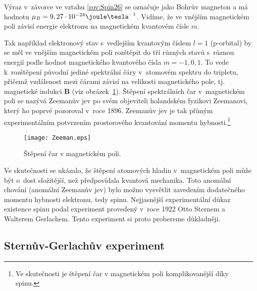 \noindent Výraz v~závorce ve vztahu \eqref{rov:Spin26} se označuje jako Bohrův magneton a má hodnotu $\mu_B = 9,27 \cdot 10^{-24} \joule \tesla^{-1}$. Vidíme, že ve vnějším magnetickém poli závisí energie elektronu na magnetickém kvantovém čísle $m$.

Tak například elektronový stav s~vedlejším kvantovým číslem $l = 1$ (p-orbital) by se měl ve vnějším magnetickém poli rozštěpit do tří různých stavů s~různou energií podle hodnot magnetického kvantového čísla $m = -1, 0, 1$. To vede k~rozštěpení původní jediné spektrální čáry v~atomovém spektru do tripletu, přičemž vzdálenost mezi čárami závisí na velikosti magnetického pole, tj. magnetické indukci $\mathbf{B}$ (viz obrázek~\ref{obr:Zeeman}). Štěpení spektrálních čar v~magnetickém poli se nazývá Zeemanův jev po svém objeviteli holandském fyzikovi Zeemanovi, který ho poprvé pozoroval v~roce 1896. Zeemanův jev je tak přímým experimentálním potvrzením prostorového kvantování momentu hybnosti.\footnote{Ve skutečnosti je štěpení čar v magnetickém poli komplikovanější díky spinu.}

\begin{figure} [htb]
\centering
\texttt{[image: Zeeman.eps]}
\caption{Štěpení čar v magnetickém poli.}
\label{obr:Zeeman}
\end{figure}

Ve skutečnosti se ukázalo, že štěpení atomových hladin v~magnetickém poli může být o~dost složitější, než předpovídala kvantová mechanika. Toto  anomální chování (anomální Zeemanův jev) bylo možno vysvětlit zavedením dodatečného momentu hybnosti elektronu, tedy spinu. Nejjasnější experimentální důkaz existence spinu podal experiment provedený v~roce 1922 Otto Sternem a Walterem Gerlachem. Tento experiment si proto probereme důkladněji.    


\subsection{Sternův-Gerlachův experiment}
\label{kap:SG experiment}

